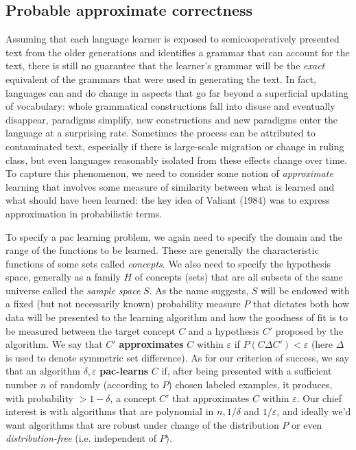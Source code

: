 \subsection{Probable approximate correctness}

Assuming that each language learner is exposed to semicooperatively presented
text from the older generations and identifies a grammar that can account for
the text, there is still no guarantee that the learner's grammar will be the
{\it exact} equivalent of the grammars that were used in generating the
text. In fact, languages can and do change in aspects that go far beyond a
superficial updating of vocabulary: whole grammatical constructions fall into
disuse and eventually disappear, paradigms simplify, new constructions and new
paradigms enter the language at a surprising rate. Sometimes the process can
be attributed to contaminated text, especially if there is large-scale
migration or change in ruling class, but even languages reasonably isolated
from these effects change over time. To capture this phenomenon, we need to
consider some notion of {\it approximate} learning that involves some measure
of similarity between what is learned and what should have been learned: the
key idea of Valiant (1984) was to express approximation in probabilistic
terms.\nocite{Valiant:1984}

To specify a pac learning problem, we again need to specify the domain and the
range of the functions to be learned. These are generally the characteristic
functions of some sets called {\it concepts}. We also need to specify the
hypothesis space, generally as a family $H$ of concepts (sets) that are all
subsets of the same universe called the {\it sample space} $S$. As the name
suggests, $S$ will be endowed with a fixed (but not necessarily known)
probability measure $P$ that dictates both how data will be presented to the
learning algorithm and how the goodness of fit is to be measured between the
target concept $C$ and a hypothesis $C'$ proposed by the algorithm.  We say
that $C'$ {\bf approximates} $C$ within $\varepsilon$ if $P(C \Delta C') <
\varepsilon$ (here $\Delta$ is used to denote symmetric set difference).  As
for our criterion of success, we say that an algorithm $\delta,\varepsilon$
{\bf pac-learns} $C$ if, after
being presented with a sufficient number $n$ of randomly (according to $P$)
chosen labeled examples, it produces, with probability $ > 1 - \delta$, a
concept $C'$ that approximates $C$ within $\varepsilon$. Our chief interest is
with algorithms that are polynomial in $n, 1/\delta$ and $1/\varepsilon$, and
ideally we'd want algorithms that are robust under change of the distribution
$P$ or even {\it distribution-free} (i.e. independent of $P$).


